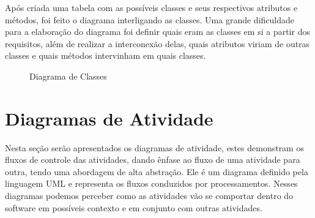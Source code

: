 \documentclass[12pt]{article}
\begin{document}
Após criada uma tabela com as possíveis classes e seus respectivos atributos e métodos, foi feito o diagrama interligando as classes. Uma grande dificuldade para a elaboração do diagrama foi definir quais eram as classes em si a partir dos requisitos, além de realizar a interconexão delas, quais atributos viriam de outras classes e quais métodos intervinham em quais classes.


  \begin{figure}[!htb]
    \caption{\label{fig:diagClasses} Diagrama de Classes}
  \end{figure}

\vfill%
\pagebreak%

\section{Diagramas de Atividade}%

Nesta seção serão apresentados os diagramas de atividade, estes demonstram os fluxos de controle das atividades, dando ênfase ao fluxo de uma atividade para outra, tendo uma abordagem de alta abstração. Ele é um diagrama definido pela linguagem UML e representa os fluxos conduzidos por processamentos. Nesses diagramas podemos perceber como as atividades vão se comportar dentro do software em possíveis contexto e em conjunto com outras atividades.
\end{document}
